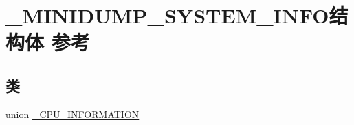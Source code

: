 \hypertarget{struct___m_i_n_i_d_u_m_p___s_y_s_t_e_m___i_n_f_o}{}\section{\+\_\+\+M\+I\+N\+I\+D\+U\+M\+P\+\_\+\+S\+Y\+S\+T\+E\+M\+\_\+\+I\+N\+F\+O结构体 参考}
\label{struct___m_i_n_i_d_u_m_p___s_y_s_t_e_m___i_n_f_o}
\subsection*{类}
\begin{DoxyCompactItemize}
\item 
union \hyperlink{union___m_i_n_i_d_u_m_p___s_y_s_t_e_m___i_n_f_o_1_1___c_p_u___i_n_f_o_r_m_a_t_i_o_n}{\+\_\+\+C\+P\+U\+\_\+\+I\+N\+F\+O\+R\+M\+A\+T\+I\+ON}
\end{DoxyCompactItemize}
